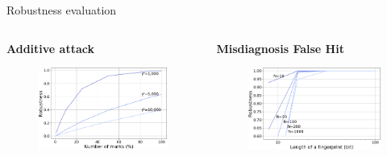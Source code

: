 \documentclass[final,hyperref={pdfpagelabels=true}]{beamer}
\begin{document}
\begin{frame}
\begin{columns}[t]
\begin{column}{.45\textwidth}
      \begin{block}{Robustness evaluation}
        \begin{columns}
            \begin{column}{.49\textwidth}
            \centering
            \textcolor{myred}{\textbf{Additive attack}}
                \begin{figure}
                    \centering \includegraphics[width=\textwidth]{additive_poster.png}
                \end{figure}
            \end{column}
            
            \begin{column}{.49\textwidth}
            \centering
            \textcolor{myred}{\textbf{Misdiagnosis False Hit}}
            \begin{figure}
                \centering
                \includegraphics[width=\textwidth]{misdiagnosis_poster.png}
            \end{figure}
        

\end{column}
\end{columns}
\end{block}
\end{column}
\end{columns}
\end{frame}
\end{document}
